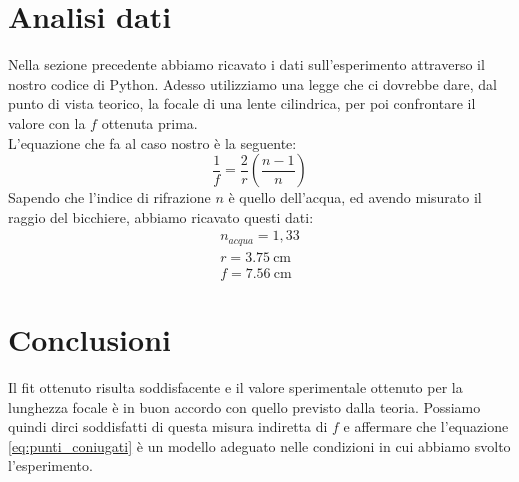 \documentclass{article}
\begin{document}
\section{Analisi dati}
    Nella sezione precedente abbiamo ricavato i dati sull'esperimento attraverso il nostro codice di Python. Adesso utilizziamo una legge che ci dovrebbe dare, dal punto di vista teorico, la focale di una lente cilindrica, per poi confrontare il valore con la $f$ ottenuta prima.\\
    L'equazione che fa al caso nostro è la seguente:
    \begin{equation}\label{eq:lente_cilindrica}
        \frac{1}{f} = \frac{2}{r} (\frac{n-1}{n})
    \end{equation}
    Sapendo che l'indice di rifrazione $n$ è quello dell'acqua, ed avendo misurato il raggio del bicchiere, abbiamo ricavato questi dati:
    \begin{gather*}
        n_{acqua} = 1,33 \\
        r = \SI{3,75}{\cm} \\
        f = \SI{7,56}{\cm}
    \end{gather*}




\section{Conclusioni}
    Il fit ottenuto risulta soddisfacente e il valore sperimentale ottenuto
    per la lunghezza focale è in buon accordo con quello previsto dalla teoria.
    Possiamo quindi dirci soddisfatti di questa misura indiretta di $f$ e affermare che
    l'equazione \ref{eq:punti_coniugati} è un modello adeguato nelle condizioni in
    cui abbiamo svolto l'esperimento.

    
\end{document}
